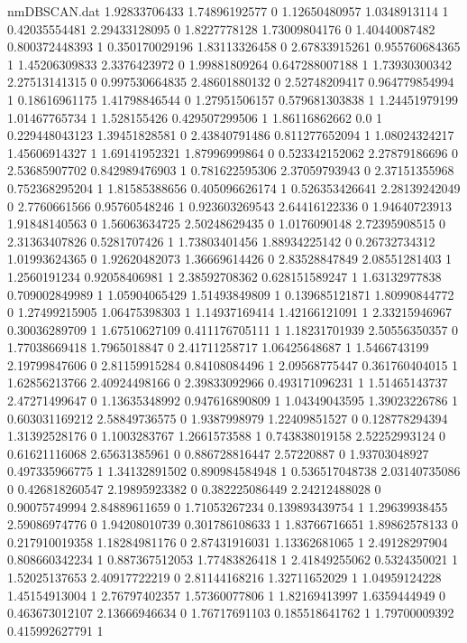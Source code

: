 \begin{filecontents}{nmDBSCAN.dat}
1.92833706433 1.74896192577 0
1.12650480957 1.0348913114 1
0.42035554481 2.29433128095 0
1.8227778128 1.73009804176 0
1.40440087482 0.800372448393 1
0.350170029196 1.83113326458 0
2.67833915261 0.955760684365 1
1.45206309833 2.3376423972 0
1.99881809264 0.647288007188 1
1.73930300342 2.27513141315 0
0.997530664835 2.48601880132 0
2.52748209417 0.964779854994 1
0.18616961175 1.41798846544 0
1.27951506157 0.579681303838 1
1.24451979199 1.01467765734 1
1.528155426 0.429507299506 1
1.86116862662 0.0 1
0.229448043123 1.39451828581 0
2.43840791486 0.811277652094 1
1.08024324217 1.45606914327 1
1.69141952321 1.87996999864 0
0.523342152062 2.27879186696 0
2.53685907702 0.842989476903 1
0.781622595306 2.37059793943 0
2.37151355968 0.752368295204 1
1.81585388656 0.405096626174 1
0.526353426641 2.28139242049 0
2.7760661566 0.95760548246 1
0.923603269543 2.64416122336 0
1.94640723913 1.91848140563 0
1.56063634725 2.50248629435 0
1.0176090148 2.72395908515 0
2.31363407826 0.5281707426 1
1.73803401456 1.88934225142 0
0.26732734312 1.01993624365 0
1.92620482073 1.36669614426 0
2.83528847849 2.08551281403 1
1.2560191234 0.92058406981 1
2.38592708362 0.628151589247 1
1.63132977838 0.709002849989 1
1.05904065429 1.51493849809 1
0.139685121871 1.80990844772 0
1.27499215905 1.06475398303 1
1.14937169414 1.42166121091 1
2.33215946967 0.30036289709 1
1.67510627109 0.411176705111 1
1.18231701939 2.50556350357 0
1.77038669418 1.7965018847 0
2.41711258717 1.06425648687 1
1.5466743199 2.19799847606 0
2.81159915284 0.84108084496 1
2.09568775447 0.361760404015 1
1.62856213766 2.40924498166 0
2.39833092966 0.493171096231 1
1.51465143737 2.47271499647 0
1.13635348992 0.947616890809 1
1.04349043595 1.39023226786 1
0.603031169212 2.58849736575 0
1.9387998979 1.22409851527 0
0.128778294394 1.31392528176 0
1.1003283767 1.2661573588 1
0.743838019158 2.52252993124 0
0.61621116068 2.65631385961 0
0.886728816447 2.57220887 0
1.93703048927 0.497335966775 1
1.34132891502 0.890984584948 1
0.536517048738 2.03140735086 0
0.426818260547 2.19895923382 0
0.382225086449 2.24212488028 0
0.90075749994 2.84889611659 0
1.71053267234 0.139893439754 1
1.29639938455 2.59086974776 0
1.94208010739 0.301786108633 1
1.83766716651 1.89862578133 0
0.217910019358 1.18284981176 0
2.87431916031 1.13362681065 1
2.49128297904 0.808660342234 1
0.887367512053 1.77483826418 1
2.41849255062 0.5324350021 1
1.52025137653 2.40917722219 0
2.81144168216 1.32711652029 1
1.04959124228 1.45154913004 1
2.76797402357 1.57360077806 1
1.82169413997 1.6359444949 0
0.463673012107 2.13666946634 0
1.76717691103 0.185518641762 1
1.79700009392 0.415992627791 1

\end{filecontents}
